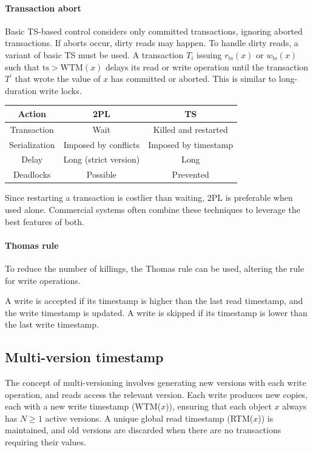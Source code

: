 \paragraph*{Transaction abort}
Basic TS-based control considers only committed transactions, ignoring aborted transactions. 
If aborts occur, dirty reads may happen. 
To handle dirty reads, a variant of basic TS must be used. 
A transaction $T_i$ issuing $r_{\text{ts}}(x)$ or $w_{\text{ts}}(x)$ such that $\text{ts}>\text{WTM}(x)$ delays its read or write operation until the transaction $T^\prime$ that wrote the value of $x$ has committed or aborted. 
This is similar to long-duration write locks.
\begin{table}[H]
    \centering
    \begin{tabular}{c|cc}
    \textbf{Action} & \textbf{2PL}          & \textbf{TS}          \\ \hline
    Transaction     & Wait                  & Killed and restarted \\
    Serialization   & Imposed by conflicts  & Imposed by timestamp \\
    Delay           & Long (strict version) & Long                 \\
    Deadlocks       & Possible              & Prevented           
    \end{tabular}
\end{table}
Since restarting a transaction is costlier than waiting, 2PL is preferable when used alone. 
Commercial systems often combine these techniques to leverage the best features of both. 

\paragraph*{Thomas rule}
To reduce the number of killings, the Thomas rule can be used, altering the rule for write operations. 

A write is accepted if its timestamp is higher than the last read timestamp, and the write timestamp is updated. 
A write is skipped if its timestamp is lower than the last write timestamp. 

\subsection{Multi-version timestamp}
The concept of multi-versioning involves generating new versions with each write operation, and reads access the relevant version.
Each write produces new copies, each with a new write timestamp (WTM($x$)), ensuring that each object $x$ always has $N \geq 1$ active versions.
A unique global read timestamp (RTM($x$)) is maintained, and old versions are discarded when there are no transactions requiring their values.

